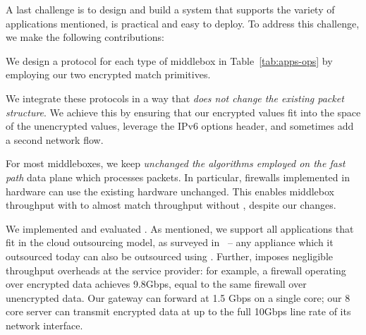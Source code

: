 A last challenge is to design and build a system that supports the variety of applications mentioned, is practical and easy to deploy. 
To address this challenge, we make the following contributions:
\begin{CompactItemize}
\item We design a  protocol for each type of middlebox in Table~\ref{tab:apps-ops} by employing our two encrypted match  primitives.
\item  We integrate these protocols in a way that {\em does not change the existing packet structure}. We achieve this by ensuring that our encrypted values fit into the space of the unencrypted values, leverage the IPv6 options header, and sometimes add a second network flow.
\item  For most middleboxes, we keep {\em unchanged  the algorithms employed on the fast path} data plane which processes packets. In particular, firewalls implemented in hardware can use the existing hardware unchanged.  This enables middlebox throughput with \sys to almost match throughput without \sys, despite our changes.
\end{CompactItemize}




We implemented and evaluated \sys. As mentioned, we support all applications that fit in the cloud outsourcing model, as surveyed in~\cite{aplomb} -- any appliance which it outsourced today can also be outsourced using \sys.
Further, \sys imposes negligible throughput overheads at the service provider: for example, a firewall operating over encrypted data achieves 9.8Gbps, equal to the same firewall over unencrypted data.
Our gateway can forward at 1.5 Gbps on a single core; our 8 core server can transmit \sys encrypted data at up to the full 10Gbps line rate of its network interface.
